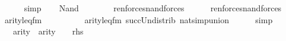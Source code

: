 \begin{isabellebody}
\ \ \ \ \isamarkupfalse%
\ simp\isanewline
{}\isamarkupfalse%
\isanewline
\ \ \isamarkupfalse%
\ {\isacharparenleft}{\kern0pt}Nand\ {\isasymphi}\ {\isasympsi}{\isacharparenright}{\kern0pt}\isanewline
\ \ \isamarkupfalse%
\ {\isacharquery}{\kern0pt}{\isasymphi}{\isacharprime}{\kern0pt}\ {\isacharequal}{\kern0pt}\ {\isachardoublequoteopen}ren{\isacharunderscore}{\kern0pt}forces{\isacharunderscore}{\kern0pt}nand{\isacharparenleft}{\kern0pt}forces{\isacharprime}{\kern0pt}{\isacharparenleft}{\kern0pt}{\isasymphi}{\isacharparenright}{\kern0pt}{\isacharparenright}{\kern0pt}{\isachardoublequoteclose}\isanewline
\ \ \isamarkupfalse%
\ {\isacharquery}{\kern0pt}{\isasympsi}{\isacharprime}{\kern0pt}\ {\isacharequal}{\kern0pt}\ {\isachardoublequoteopen}ren{\isacharunderscore}{\kern0pt}forces{\isacharunderscore}{\kern0pt}nand{\isacharparenleft}{\kern0pt}forces{\isacharprime}{\kern0pt}{\isacharparenleft}{\kern0pt}{\isasympsi}{\isacharparenright}{\kern0pt}{\isacharparenright}{\kern0pt}{\isachardoublequoteclose}\isanewline
\ \ \isamarkupfalse%
\ {\isachardoublequoteopen}arity{\isacharparenleft}{\kern0pt}leq{\isacharunderscore}{\kern0pt}fm{\isacharparenleft}{\kern0pt}{}{\isacharcomma}{\kern0pt}\ {}{\isacharcomma}{\kern0pt}\ {}{\isacharparenright}{\kern0pt}{\isacharparenright}{\kern0pt}\ {\isacharequal}{\kern0pt}\ {}{\isachardoublequoteclose}\isanewline
\ \ \ \ \isamarkupfalse%
\ arity{\isacharunderscore}{\kern0pt}leq{\isacharunderscore}{\kern0pt}fm\ succ{\isacharunderscore}{\kern0pt}Un{\isacharunderscore}{\kern0pt}distrib\ nat{\isacharunderscore}{\kern0pt}simp{\isacharunderscore}{\kern0pt}union\isanewline
\ \ \ \ \isamarkupfalse%
\ simp\isanewline
\ \ \isamarkupfalse%
\ {\isachardoublequoteopen}{}\ {\isasymle}\ {\isacharparenleft}{\kern0pt}{}{\isacharhash}{\kern0pt}{\isacharplus}{\kern0pt}arity{\isacharparenleft}{\kern0pt}{\isasymphi}{\isacharparenright}{\kern0pt}{\isacharparenright}{\kern0pt}\ {\isasymunion}\ {\isacharparenleft}{\kern0pt}{}{\isacharhash}{\kern0pt}{\isacharplus}{\kern0pt}arity{\isacharparenleft}{\kern0pt}{\isasympsi}{\isacharparenright}{\kern0pt}{\isacharparenright}{\kern0pt}{\isachardoublequoteclose}\ {\isacharparenleft}{\kern0pt}\ {\isachardoublequoteopen}{\isacharunderscore}{\kern0pt}\ {\isasymle}\ {\isacharquery}{\kern0pt}rhs{\isachardoublequoteclose}{\isacharparenright}{\kern0pt}\isanewline
\ \ \ \ \isamarkupfalse%

\end{isabellebody}
